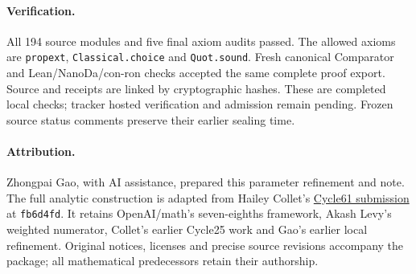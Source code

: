 \documentclass[10pt]{article}
\begin{document}
\paragraph{Verification.}
All 194 source modules and five final axiom audits passed. The allowed axioms are
\texttt{propext}, \texttt{Classical.choice} and \texttt{Quot.sound}. Fresh
canonical Comparator and Lean/NanoDa/con-ron checks accepted the same complete
proof export. Source and receipts are linked by cryptographic hashes. These
are completed local checks; tracker hosted verification and admission remain
pending. Frozen source status comments preserve their earlier sealing time.

\paragraph{Attribution.}
Zhongpai Gao, with AI assistance, prepared this parameter refinement and note.
The full analytic construction is adapted from Hailey Collet's
\href{https://github.com/GTimG/QuasiRiemannTracker/pull/42}{Cycle61 submission}
at \texttt{fb6d4fd}. It retains OpenAI/math's seven-eighths framework,
Akash Levy's weighted numerator, Collet's earlier Cycle25 work and Gao's earlier
local refinement. Original notices, licenses and precise source revisions
accompany the package; all mathematical predecessors retain their authorship.
\end{document}
